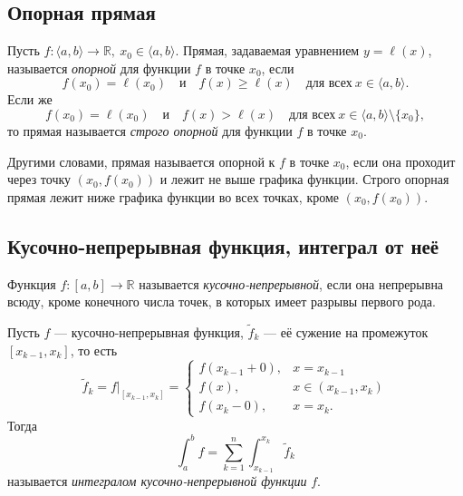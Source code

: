 \subsection{Опорная прямая}

\begin{definition}
	Пусть \(f \colon \langle a, b \rangle \to \mathbb{R}, \ x_0 \in \langle a, b \rangle\). Прямая, задаваемая уравнением \(y = \ell(x)\), называется \textit{опорной} для функции  \(f\) в точке \(x_0\), если \[
		f(x_0) = \ell(x_0) \quad \text{и} \quad f(x) \geqslant \ell(x) \quad \text{для всех} \ x \in \langle a, b \rangle. 
	\]
	Если же \[
		f(x_0) = \ell(x_0) \quad \text{и} \quad f(x) > \ell(x) \quad \text{для всех} \ x \in \langle a, b \rangle \setminus \{x_0\},
	\]
	то прямая называется \textit{строго опорной} для функции \(f\) в точке \(x_0\).
	
	Другими словами, прямая называется опорной к \(f\) в точке \(x_0\), если она проходит через точку \((x_0, f(x_0))\) и лежит не выше графика функции. Строго опорная прямая лежит ниже графика функции во всех точках, кроме \((x_0, f(x_0))\).
\end{definition}

\subsection{Кусочно-непрерывная функция, интеграл от неё}

\begin{definition}
	Функция \(f \colon [a, b] \to \mathbb{R}\) называется \textit{кусочно-непрерывной}, если она непрерывна всюду, кроме конечного числа точек, в которых имеет разрывы первого рода.
\end{definition}

\begin{definition}
	Пусть \(f\) --- кусочно-непрерывная функция, \(\widetilde{f}_k\) --- её сужение на промежуток \([x_{k - 1}, x_k]\), то есть \[
		\widetilde{f}_k = f \big|_{[x_{k - 1}, x_k]} =
		\begin{cases}
			f(x_{k - 1} + 0), & x = x_{k - 1} 		   \\
			f(x),			  & x \in (x_{k - 1}, x_k) \\
			f(x_k - 0),		  & x = x_k.
		\end{cases}
	\]
	Тогда \[
		\int_a^b f = \sum_{k = 1}^n \int_{x_{k - 1}}^{x_k} \widetilde{f}_k
	\]
	называется \textit{интегралом кусочно-непрерывной функции} \(f\).
\end{definition}

